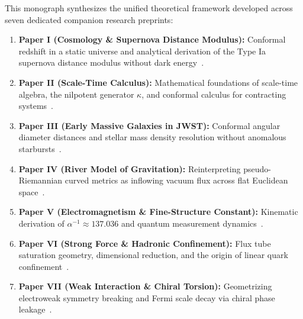 This monograph synthesizes the unified theoretical framework developed across seven dedicated companion research preprints:
\begin{enumerate}
    \item \textbf{Paper I (Cosmology \& Supernova Distance Modulus):} Conformal redshift in a static universe and analytical derivation of the Type Ia supernova distance modulus without dark energy~\cite{haydari_cosmo}.
    \item \textbf{Paper II (Scale-Time Calculus):} Mathematical foundations of scale-time algebra, the nilpotent generator $\kappa$, and conformal calculus for contracting systems~\cite{haydari_calculus}.
    \item \textbf{Paper III (Early Massive Galaxies in JWST):} Conformal angular diameter distances and stellar mass density resolution without anomalous starbursts~\cite{haydari_jwst}.
    \item \textbf{Paper IV (River Model of Gravitation):} Reinterpreting pseudo-Riemannian curved metrics as inflowing vacuum flux across flat Euclidean space~\cite{haydari_gravity}.
    \item \textbf{Paper V (Electromagnetism \& Fine-Structure Constant):} Kinematic derivation of $\alpha^{-1} \approx 137.036$ and quantum measurement dynamics~\cite{haydari_em}.
    \item \textbf{Paper VI (Strong Force \& Hadronic Confinement):} Flux tube saturation geometry, dimensional reduction, and the origin of linear quark confinement~\cite{haydari_strong}.
    \item \textbf{Paper VII (Weak Interaction \& Chiral Torsion):} Geometrizing electroweak symmetry breaking and Fermi scale decay via chiral phase leakage~\cite{haydari_weak}.
\end{enumerate}

